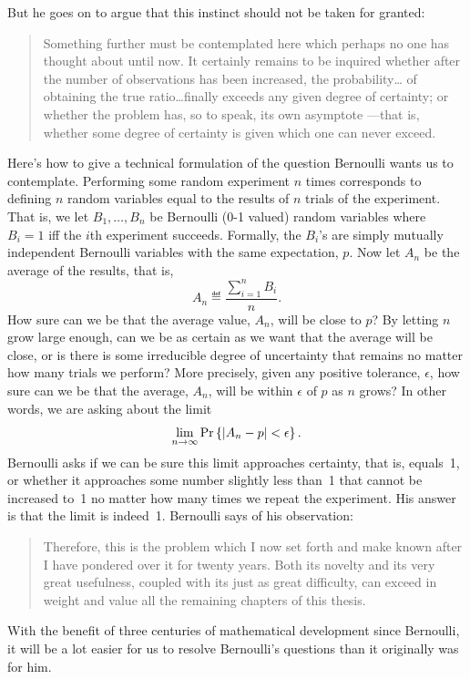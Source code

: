 \documentclass[11pt,twoside]{article}
\begin{document}
But he goes on to argue that this instinct should not be taken for
granted:
\begin{quote}
Something further must be contemplated here which perhaps no one has
thought about until now.  It certainly remains to be inquired whether
after the number of observations has been increased, the probability\dots
of obtaining the true ratio\dots finally exceeds any given degree of
certainty; or whether the problem has, so to speak, its own
asymptote ---that is, whether some degree of certainty is given which one
can never exceed.
\end{quote}

Here's how to give a technical formulation of the question Bernoulli wants
us to contemplate.  Performing some random experiment $n$ times corresponds
to defining $n$ random variables equal to the results of $n$ trials of the
experiment.  That is, we let $B_1,\dots,B_n$ be Bernoulli (0-1 valued)
random variables where $B_i = 1$ iff the $i$th experiment succeeds.
Formally, the $B_i$'s are simply mutually independent Bernoulli variables
with the same expectation, $p$.  Now let $A_n$ be the average of the
results, that is,
\[
A_n \eqdef \frac{\sum_{i=1}^n B_i}{n}.
\]
How sure can we be that the average value, $A_n$, will be close to $p$?
By letting $n$ grow large enough, can we be as certain as we want that the
average will be close, or is there is some irreducible degree of
uncertainty that remains no matter how many trials we perform?  More
precisely, given any positive tolerance, $\epsilon$, how sure can we be
that the average, $A_n$, will be within $\epsilon$ of $p$ as $n$
grows?  In other words, we are asking about the limit
\[
\lim_{n \rightarrow \infty} \mathop{\textup{Pr}}\nolimits\left\{\left|A_n-p\right| < \epsilon\right\}.
\]
Bernoulli asks if we can be sure this limit approaches certainty, that is,
equals~1, or whether it approaches some number slightly less than~1
that cannot be increased to~1 no matter how many times we repeat the
experiment.  His answer is that the limit is indeed~1.  Bernoulli says
of his observation:
\begin{quote}
Therefore, this is the problem which I now set forth and make known after
I have pondered over it for twenty years.  Both its novelty and its very
great usefulness, coupled with its just as great difficulty, can exceed in
weight and value all the remaining chapters of this thesis.
\end{quote}

With the benefit of three centuries of mathematical development since
Bernoulli, it will be a lot easier for us to resolve Bernoulli's questions
than it originally was for him.
\end{document}
